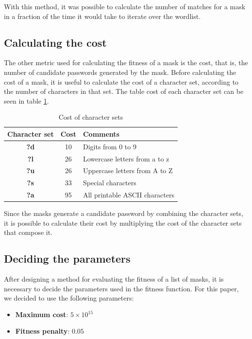 \documentclass[sigconf,authordraft]{acmart}
\begin{document}
With this method, it was possible to calculate the number of matches for a mask in a fraction of the time it would take to iterate over the wordlist.

\subsection{Calculating the cost}

The other metric used for calculating the fitness of a mask is the cost, that is, the number of candidate passwords generated by the mask.
Before calculating the cost of a mask, it is useful to calculate the cost of a character set, according to the number of characters in that set.
The table cost of each character set can be seen in table \ref{tab:cost}.

\begin{table}
  \caption{Cost of character sets}
  \label{tab:cost}
  \begin{tabular}{ccl}
    \toprule
    Character set & Cost & Comments\\
    \midrule
    \textbf{?d} & 10 & Digits from 0 to 9\\
    \textbf{?l} & 26 & Lowercase letters from a to z\\
    \textbf{?u} & 26 & Uppercase letters from A to Z\\
    \textbf{?s} & 33 & Special characters\\
    \textbf{?a} & 95 & All printable ASCII characters\\
    \bottomrule
  \end{tabular}
\end{table}

Since the masks generate a candidate password by combining the character sets, it is possible to calculate their cost by multiplying the cost of the character sets that compose it.

\subsection{Deciding the parameters}
\label{sec:deciding_parameters}

After designing a method for evaluating the fitness of a list of masks, it is necessary to decide the parameters used in the fitness function.
For this paper, we decided to use the following parameters:

\begin{itemize}
  \item \textbf{Maximum cost}: $5 \times 10^{15}$
  \item \textbf{Fitness penalty}: $0.05$
\end{itemize}
\end{document}
